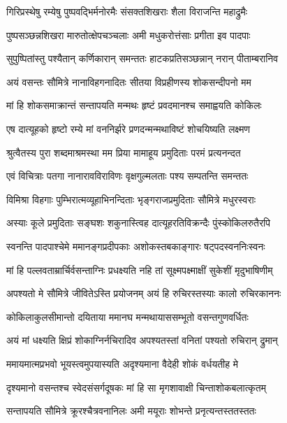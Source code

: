 \twolineshloka
{गिरिप्रस्थेषु रम्येषु पुष्पवद्भिर्मनोरमैः}
{संसक्तशिखराः शैला विराजन्ति महाद्रुमैः} %

\twolineshloka
{पुष्पसञ्छन्नशिखरा मारुतोत्क्षेपचञ्चलाः}
{अमी मधुकरोत्तंसाः प्रगीता इव पादपाः} %

\twolineshloka
{सुपुष्पितांस्तु पश्यैतान् कर्णिकारान् समन्ततः}
{हाटकप्रतिसञ्छन्नान् नरान् पीताम्बरानिव} %

\twolineshloka
{अयं वसन्तः सौमित्रे नानाविहगनादितः}
{सीतया विप्रहीणस्य शोकसन्दीपनो मम} %

\twolineshloka
{मां हि शोकसमाक्रान्तं सन्तापयति मन्मथः}
{हृष्टं प्रवदमानश्च समाह्वयति कोकिलः} %

\twolineshloka
{एष दात्यूहको हृष्टो रम्ये मां वननिर्झरे}
{प्रणदन्मन्मथाविष्टं शोचयिष्यति लक्ष्मण} %

\twolineshloka
{श्रुत्वैतस्य पुरा शब्दमाश्रमस्था मम प्रिया}
{मामाहूय प्रमुदिताः परमं प्रत्यनन्दत} %

\twolineshloka
{एवं विचित्राः पतगा नानारावविराविणः}
{वृक्षगुल्मलताः पश्य सम्पतन्ति समन्ततः} %

\twolineshloka
{विमिश्रा विहगाः पुम्भिरात्मव्यूहाभिनन्दिताः}
{भृङ्गराजप्रमुदिताः सौमित्रे मधुरस्वराः} %

\twolineshloka
{अस्याः कूले प्रमुदिताः सङ्घशः शकुनास्त्विह}
{दात्यूहरतिविक्रन्दैः पुंस्कोकिलरुतैरपि} %

\twolineshloka
{स्वनन्ति पादपाश्चेमे ममानङ्गप्रदीपकाः}
{अशोकस्तबकाङ्गारः षट्पदस्वननिःस्वनः} %

\twolineshloka
{मां हि पल्लवताम्रार्चिर्वसन्ताग्निः प्रधक्ष्यति}
{नहि तां सूक्ष्मपक्ष्माक्षीं सुकेशीं मृदुभाषिणीम्} %

\twolineshloka
{अपश्यतो मे सौमित्रे जीवितेऽस्ति प्रयोजनम्}
{अयं हि रुचिरस्तस्याः कालो रुचिरकाननः} %

\twolineshloka
{कोकिलाकुलसीमान्तो दयिताया ममानघ}
{मन्मथायाससम्भूतो वसन्तगुणवर्धितः} %

\twolineshloka
{अयं मां धक्ष्यति क्षिप्रं शोकाग्निर्नचिरादिव}
{अपश्यतस्तां वनितां पश्यतो रुचिरान् द्रुमान्} %

\twolineshloka
{ममायमात्मप्रभवो भूयस्त्वमुपयास्यति}
{अदृश्यमाना वैदेही शोकं वर्धयतीह मे} %

\twolineshloka
{दृश्यमानो वसन्तश्च स्वेदसंसर्गदूषकः}
{मां हि सा मृगशावाक्षी चिन्ताशोकबलात्कृतम्} %

\twolineshloka
{सन्तापयति सौमित्रे क्रूरश्चैत्रवनानिलः}
{अमी मयूराः शोभन्ते प्रनृत्यन्तस्ततस्ततः} %

